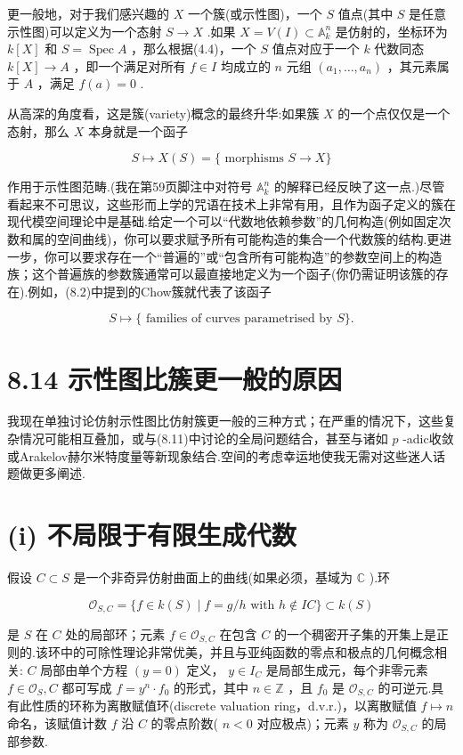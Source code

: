 更一般地，对于我们感兴趣的 \(X\) 一个簇(或示性图)，一个 \(S\) 值点(其中 \(S\) 是任意示性图)可以定义为一个态射 \(S \rightarrow  X\) .如果 \(X = V\left( I\right)  \subset  {\mathbb{A}}_{k}^{n}\) 是仿射的，坐标环为 \(k\left\lbrack  X\right\rbrack\) 和 \(S = \operatorname{Spec}A\) ，那么根据(4.4)，一个 \(S\) 值点对应于一个 \(k\) 代数同态 \(k\left\lbrack  X\right\rbrack   \rightarrow  A\) ，即一个满足对所有 \(f \in  I\) 均成立的 \(n\) 元组 \(\left( {{a}_{1},\ldots ,{a}_{n}}\right)\) ，其元素属于 \(A\) ，满足 \(f\left( a\right)  = 0\) .

从高深的角度看，这是簇(variety)概念的最终升华:如果簇 \(X\) 的一个点仅仅是一个态射，那么 \(X\) 本身就是一个函子

\[
S \mapsto  X\left( S\right)  = \{ \text{ morphisms }S \rightarrow  X\}
\]

作用于示性图范畴.(我在第59页脚注中对符号 \({\mathbb{A}}_{k}^{n}\) 的解释已经反映了这一点.)尽管看起来不可思议，这些形而上学的咒语在技术上非常有用，且作为函子定义的簇在现代模空间理论中是基础.给定一个可以“代数地依赖参数”的几何构造(例如固定次数和属的空间曲线)，你可以要求赋予所有可能构造的集合一个代数簇的结构.更进一步，你可以要求存在一个“普遍的”或“包含所有可能构造”的参数空间上的构造族；这个普遍族的参数簇通常可以最直接地定义为一个函子(你仍需证明该簇的存在).例如，(8.2)中提到的Chow簇就代表了该函子

\[
S \mapsto  \{ \text{ families of curves parametrised by }S\} .
\]

\section{8.14 示性图比簇更一般的原因}

我现在单独讨论仿射示性图比仿射簇更一般的三种方式；在严重的情况下，这些复杂情况可能相互叠加，或与(8.11)中讨论的全局问题结合，甚至与诸如 \(p\) -adic收敛或Arakelov赫尔米特度量等新现象结合.空间的考虑幸运地使我无需对这些迷人话题做更多阐述.

\section{(i) 不局限于有限生成代数}

假设 \(C \subset  S\) 是一个非奇异仿射曲面上的曲线(如果必须，基域为 \(\mathbb{C}\) ).环

\[
{\mathcal{O}}_{S,C} = \{ f \in  k\left( S\right)  \mid  f = g/h\text{ with }h \notin  {IC}\}  \subset  k\left( S\right)
\]

是 \(S\) 在 \(C\) 处的局部环；元素 \(f \in  {\mathcal{O}}_{S,C}\) 在包含 \(C\) 的一个稠密开子集的开集上是正则的.该环中的可除性理论非常优美，并且与亚纯函数的零点和极点的几何概念相关: \(C\) 局部由单个方程 \(\left( {y = 0}\right)\) 定义， \(y \in  {I}_{C}\) 是局部生成元，每个非零元素 \(f \in  {\mathcal{O}}_{S},C\) 都可写成 \(f = {y}^{n} \cdot  {f}_{0}\) 的形式，其中 \(n \in  \mathbb{Z}\) ，且 \({f}_{0}\) 是 \({\mathcal{O}}_{S,C}\) 的可逆元.具有此性质的环称为离散赋值环(discrete valuation ring，d.v.r.)，以离散赋值 \(f \mapsto  n\) 命名，该赋值计数 \(f\) 沿 \(C\) 的零点阶数( \(n < 0\) 对应极点)；元素 \(y\) 称为 \({\mathcal{O}}_{S,C}\) 的局部参数.


